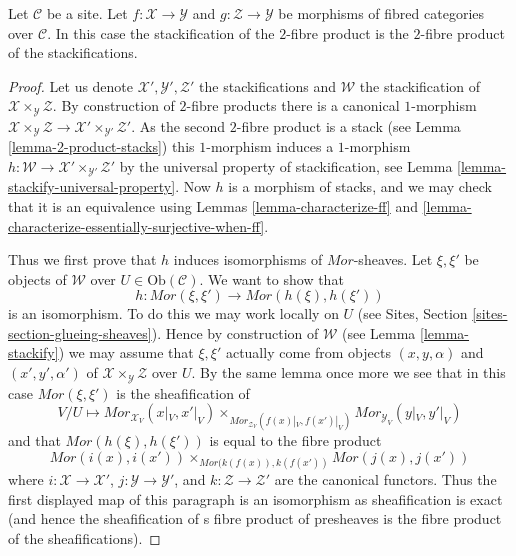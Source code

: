 \begin{lemma}
\label{lemma-stackification-fibre-product-fibred-categories}
Let $\mathcal{C}$ be a site.
Let $f : \mathcal{X} \to \mathcal{Y}$ and $g : \mathcal{Z} \to \mathcal{Y}$
be morphisms of fibred categories over $\mathcal{C}$.
In this case the stackification of the $2$-fibre product is the $2$-fibre
product of the stackifications.
\end{lemma}

\begin{proof}
Let us denote $\mathcal{X}', \mathcal{Y}', \mathcal{Z}'$ the stackifications
and $\mathcal{W}$ the stackification of
$\mathcal{X} \times_{\mathcal{Y}} \mathcal{Z}$. By construction of $2$-fibre
products there is a canonical $1$-morphism
$\mathcal{X} \times_{\mathcal{Y}} \mathcal{Z} \to
\mathcal{X}' \times_{\mathcal{Y}'} \mathcal{Z}'$.
As the second $2$-fibre product is a stack (see
Lemma \ref{lemma-2-product-stacks})
this $1$-morphism induces a $1$-morphism
$h : \mathcal{W} \to \mathcal{X}' \times_{\mathcal{Y}'} \mathcal{Z}'$
by the universal property of stackification, see
Lemma \ref{lemma-stackify-universal-property}.
Now $h$ is a morphism of stacks, and we may check that it is an
equivalence using
Lemmas \ref{lemma-characterize-ff} and
\ref{lemma-characterize-essentially-surjective-when-ff}.

\medskip\noindent
Thus we first prove that $h$ induces isomorphisms of $\mathit{Mor}$-sheaves.
Let $\xi, \xi'$ be objects of $\mathcal{W}$ over
$U \in \text{Ob}(\mathcal{C})$. We want to show that
$$
h : \mathit{Mor}(\xi, \xi') \longrightarrow \mathit{Mor}(h(\xi), h(\xi'))
$$
is an isomorphism. To do this we may work locally on $U$ (see
Sites, Section \ref{sites-section-glueing-sheaves}).
Hence by construction of $\mathcal{W}$ (see
Lemma \ref{lemma-stackify})
we may assume that $\xi, \xi'$
actually come from objects $(x, y, \alpha)$ and $(x', y', \alpha')$
of $\mathcal{X} \times_{\mathcal{Y}} \mathcal{Z}$ over $U$.
By the same lemma once more we see that in this case
$\mathit{Mor}(\xi, \xi')$ is the sheafification of
$$
V/U \longmapsto
\textit{Mor}_{\mathcal{X}_V}(x|_V, x'|_V)
\times_{\textit{Mor}_{\mathcal{Z}_V}(f(x)|_V, f(x')|_V)}
\textit{Mor}_{\mathcal{Y}_V}(y|_V, y'|_V)
$$
and that $\mathit{Mor}(h(\xi), h(\xi'))$ is equal to the fibre product
$$
\textit{Mor}(i(x), i(x'))
\times_{\mathit{Mor}(k(f(x)), k(f(x'))}
\textit{Mor}(j(x), j(x'))
$$
where $i : \mathcal{X} \to \mathcal{X}'$,
$j : \mathcal{Y} \to \mathcal{Y}'$, and
$k : \mathcal{Z} \to \mathcal{Z}'$ are the canonical functors.
Thus the first displayed map of this paragraph is an isomorphism as
sheafification is exact (and hence the sheafification of s fibre product
of presheaves is the fibre product of the sheafifications).


\end{proof}
